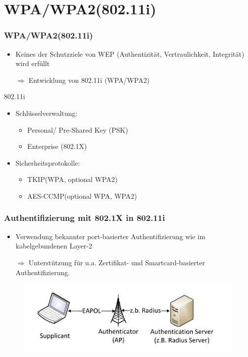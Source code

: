 \documentclass{beamer}
\begin{document}
\section{WPA/WPA2(802.11i)}
\begin{frame}
\frametitle{WPA/WPA2(802.11i)}
\begin{itemize}
	\item Keines der Schutzziele von WEP (Authentizität, Vertraulichkeit, Integrität) wird erfüllt
	\item[$\Rightarrow$] Entwicklung von 802.11i (WPA/WPA2)
\end{itemize}
\begin{block}{802.11i}
\begin{itemize}
	\item Schlüsselverwaltung:
	\begin{itemize}
		\item Personal/ Pre-Shared Key (PSK)
		\item Enterprise (802.1X)
	\end{itemize}
	\item Sicherheitsprotokolle:
	\begin{itemize}
		\item TKIP(WPA, optional WPA2)
		\item AES-CCMP(optional WPA, WPA2)
	\end{itemize}
\end{itemize}
\end{block}
\end{frame}

\begin{frame}
	\frametitle{Authentifizierung mit 802.1X in 802.11i}
	\begin{itemize}
		\item Verwendung bekannter port-basierter Authentifizierung wie im kabelgebundenen Layer-2
		\item[$\Rightarrow$] Unterstützung für u.a. Zertifikat- und Smartcard-basierter Authentifizierung.
	\end{itemize}
	\begin{figure}
		\includegraphics[scale=0.7]{figures/ap_radius.pdf}

	\end{figure}
\end{frame}
\end{document}
